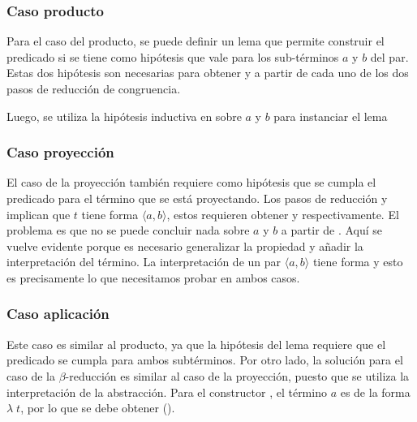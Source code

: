 \subsubsection{Caso producto}

Para el caso del producto, se puede definir un lema que permite construir el predicado si se tiene como hipótesis que \snstar vale para los sub-términos $a$ y $b$ del par.
Estas dos hipótesis son necesarias para obtener \snstar {} y \snstar {} a partir de cada uno de los dos pasos de reducción de congruencia.


Luego, se utiliza la hipótesis inductiva en  sobre $a$ y $b$ para instanciar el lema


\subsubsection{Caso proyección}

El caso de la proyección también requiere como hipótesis que se cumpla el predicado para el término que se está proyectando.
Los pasos de reducción  y  implican que $t$ tiene forma $\langle a, b \rangle$, estos requieren obtener \snstar {} y \snstar {} respectivamente.
El problema es que no se puede concluir nada sobre $a$ y $b$ a partir de .
Aquí se vuelve evidente porque es necesario generalizar la propiedad  y añadir la interpretación del término.
La interpretación de un par $\langle a, b \rangle$ tiene forma \snstar{}  \snstar{} y esto es precisamente lo que necesitamos probar en ambos casos.


\subsubsection{Caso aplicación}

Este caso es similar al producto, ya que la hipótesis del lema requiere que el predicado se cumpla para ambos subtérminos.
Por otro lado, la solución para el caso de la $\beta$-reducción es similar al caso de la proyección, puesto que se utiliza la interpretación de la abstracción.
Para el constructor , el término $a$ es de la forma $\lambda\; t$, por lo que se debe obtener
\snstar(\func{[}\func{]}).

